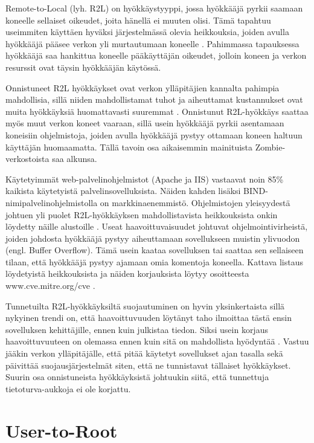 Remote-to-Local (lyh. R2L) on hyökkäystyyppi, jossa hyökkääjä pyrkii
saamaan koneelle sellaiset oikeudet, joita hänellä ei muuten
olisi. Tämä tapahtuu useimmiten käyttäen hyväksi järjestelmässä olevia
heikkouksia, joiden avulla hyökkääjä pääsee verkon yli murtautumaan
koneelle \cite{IDS}. Pahimmassa tapauksessa hyökkääjä saa hankittua koneelle
pääkäyttäjän oikeudet, jolloin koneen ja verkon resurssit ovat täysin
hyökkääjän käytössä.

Onnistuneet R2L hyökkäykset ovat verkon ylläpitäjien kannalta pahimpia
mahdollisia, sillä niiden mahdollistamat tuhot ja aiheuttamat kustannukset ovat
muita hyökkäyksiä huomattavasti suuremmat \cite{IDSb}. Onnistunut R2L-hyökkäys saattaa
myös muut verkon koneet vaaraan, sillä usein hyökkääjä pyrkii asentamaan
koneisiin ohjelmistoja, joiden avulla hyökkääjä pystyy ottamaan koneen haltuun
käyttäjän huomaamatta. Tällä tavoin osa aikaisemmin mainituista Zombie-
verkostoista saa alkunsa.

Käytetyimmät web-palvelinohjelmistot (Apache ja IIS) vastaavat noin 85\%
kaikista käytetyistä palvelinsovelluksista. Näiden kahden lisäksi BIND-
nimipalvelinohjelmistolla on markkinaenemmistö. Ohjelmistojen yleisyydestä
johtuen yli puolet R2L-hyökkäyksen mahdollistavista heikkouksista onkin
löydetty näille alustoille \cite{IDS}. Useat haavoittuvaisuudet johtuvat
ohjelmointivirheistä, joiden johdosta hyökkääjä pystyy aiheuttamaan
sovellukseen muistin ylivuodon (engl. Buffer Overflow). Tämä usein kaataa
sovelluksen tai saattaa sen sellaiseen tilaan, että hyökkääjä pystyy ajamaan
omia komentoja koneella. Kattava listaus löydetyistä heikkouksista ja näiden
korjauksista löytyy osoitteesta www.cve.mitre.org/cve \cite{CVE}.

Tunnetuilta R2L-hyökkäyksiltä suojautuminen on hyvin yksinkertaista sillä
nykyinen trendi on, että haavoittuvuuden löytänyt taho ilmoittaa tästä ensin
sovelluksen kehittäjille, ennen kuin julkistaa tiedon. Siksi usein korjaus
haavoittuvuuteen on olemassa ennen kuin sitä on mahdollista hyödyntää \cite{IDSb}.
Vastuu jääkin verkon ylläpitäjälle, että pitää käytetyt sovellukset ajan
tasalla sekä päivittää suojausjärjestelmät siten, että ne tunnistavat tällaiset
hyökkäykset. Suurin osa onnistuneista hyökkäyksistä johtuukin siitä, että
tunnettuja tietoturva-aukkoja ei ole korjattu.

\section{User-to-Root}

